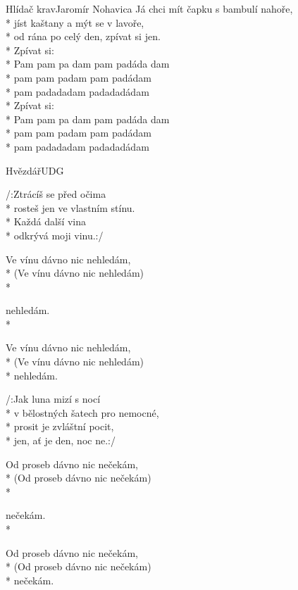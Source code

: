 \documentclass[10.5pt]{book}
\begin{document}
\begin{poem}{Hlídač krav}{Jaromír Nohavica}
Já chci mít čapku s bambulí nahoře,\\*
jíst kaštany a mýt se v lavoře,\\*
od rána po celý den, zpívat si jen.\\*
Zpívat si:\\*
Pam pam pa dam pam padáda dam\\*
pam pam padam pam padádam\\*
pam padadadam padadadádam\\*
Zpívat si:\\*
Pam pam pa dam pam padáda dam\\*
pam pam padam pam padádam\\*
pam padadadam padadadádam

\end{poem}

\begin{poem}{Hvězdář}{UDG}

\settowidth{\versewidth}{v bělostných šatech pro nemocné,}

/:Ztrácíš se před očima\\*
rosteš jen ve vlastním stínu.\\*
Každá další vina\\*
odkrývá moji vinu.:/

\begin{altverse}
Ve vínu dávno nic nehledám, \\*
(Ve vínu dávno nic nehledám) \\*
\end{altverse}
nehledám.\\*
\begin{altverse}
Ve vínu dávno nic nehledám, \\*
(Ve vínu dávno nic nehledám) \\*
nehledám.
\end{altverse}

/:Jak luna mizí s nocí\\*
v bělostných šatech pro nemocné,\\*
prosit je zvláštní pocit,\\*
jen, ať je den, noc ne.:/

\begin{altverse}
Od proseb dávno nic nečekám, \\*
(Od proseb dávno nic nečekám) \\*
\end{altverse}
nečekám.\\*
\begin{altverse}
Od proseb dávno nic nečekám, \\*
(Od proseb dávno nic nečekám) \\*
nečekám.
\end{altverse}


\end{poem}
\end{document}
